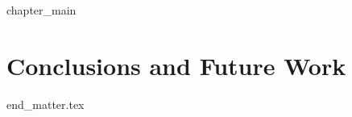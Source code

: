 \documentclass[cover]{dissertation}
\begin{document}



\ifchapeight
    {chapter_main}
\else
    \chapter{Conclusions and Future Work}
    \label{chapter:conclusions}
\fi
 

\thumbfalse
\FloatBarrier

{end_matter.tex}
\end{document}
